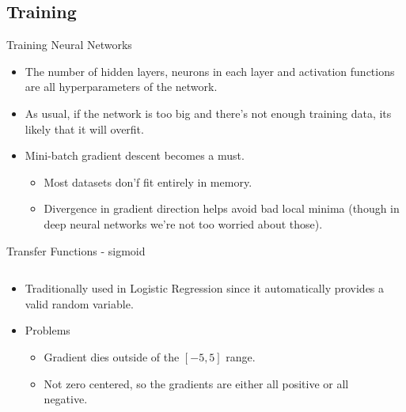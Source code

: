 \subsection{Training}
\begin{frame}{Training Neural Networks}
	\begin{itemize}
		\item The number of hidden layers, neurons in each layer and activation functions are all hyperparameters of the network.
		\item As usual, if the network is too big and there's not enough training data, its likely that it will overfit.
		\item Mini-batch gradient descent becomes a must.
		\begin{itemize}
			\item Most datasets don'f fit entirely in memory.
			\item Divergence in gradient direction helps avoid bad local minima (though in deep neural networks we're not too worried about those). 
		\end{itemize}
	\end{itemize}
\end{frame}

\begin{frame}{Transfer Functions - sigmoid}
	\begin{columns}
		\begin{column}{0.5\textwidth}
			\begin{itemize}
				\item Traditionally used in Logistic Regression since it automatically provides a valid random variable.
				\item Problems
				\begin{itemize}
					\item Gradient dies outside of the $[-5, 5]$ range.
					\item Not zero centered, so the gradients are either all positive or all negative.
				\end{itemize}
			\end{itemize}
		\end{column}
		\begin{column}{0.5\textwidth}
		\end{column}
	\end{columns}
\end{frame}

